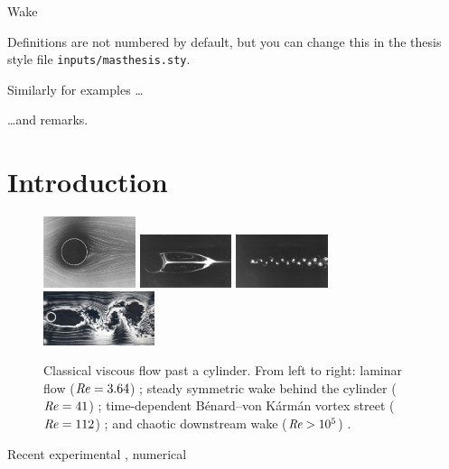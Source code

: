 \begin{chapter}{\label{cha:wake}Wake}
  \begin{definition}
    Definitions are not numbered by default, but you can change this in the
    thesis style file \verb"inputs/masthesis.sty".
  \end{definition}

  \begin{example}
    Similarly for examples \ldots
  \end{example}

  \begin{remark}
    \ldots and remarks.
  \end{remark}

\section{Introduction}
\begin{figure}[h]
\centering
  \includegraphics[height=2.08cm,angle=180]{wake/3.png}
  \includegraphics[width=0.24\textwidth,angle=180]{wake/taneda41}
  \includegraphics[width=0.24\textwidth,angle=180]{wake/taneda112}
    \includegraphics[width=0.29\textwidth,angle=180]{wake/turb.jpg}
  \caption{Classical viscous flow past a cylinder. From left to right: laminar flow ($\mbox{\ensuremath{\mathit{Re}}}=3.64$) \cite{taneda41}; steady symmetric wake behind the cylinder ($\mbox{\ensuremath{\mathit{Re}}}=41$) \cite{taneda41}; time-dependent B\'enard--von K\'arm\'an vortex street ($\mbox{\ensuremath{\mathit{Re}}} = 112$) \cite{taneda112}; and chaotic downstream wake ($\mbox{\ensuremath{\mathit{Re}}} > 10^5$) \cite{nagib}.} 
  \label{fig:taneda-imgs}
\end{figure}
Recent experimental \cite{Tabeling,Salort}, 
numerical \cite{Nore,Kobayashi,Laurie} 

\end{chapter}
